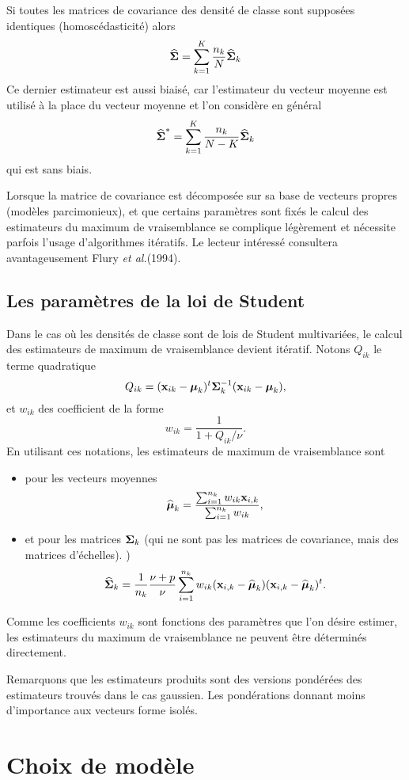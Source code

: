 Si toutes les matrices de covariance des densit\'e de classe sont
suppos\'ees identiques (homosc\'edasticit\'e) alors
$$
\widehat{\mbox{\boldmath $\Sigma$}}= \sum_{k=1}^{K} \frac{n_k}{N}\widehat{\mbox{\boldmath $\Sigma$}}_k
$$
Ce dernier estimateur est aussi biais\'e, car l'estimateur du vecteur moyenne 
est utilis\'e \`a la place du vecteur moyenne  et l'on consid\`ere en g\'en\'eral
$$
\widehat{\mbox{\boldmath $\Sigma$}}^*= \sum_{k=1}^{K} \frac{n_k}{N-K}\widehat{\mbox{\boldmath $\Sigma$}}_k
$$
qui est sans biais.


Lorsque la matrice de covariance est d\'ecompos\'ee sur sa base
de vecteurs propres (mod\`eles parcimonieux), et que certains param\`etres 
sont fix\'es le calcul des estimateurs du maximum de vraisemblance se
complique l\'eg\`erement et n\'ecessite parfois l'usage
d'algorithmes it\'eratifs. Le lecteur int\'eress\'e consultera
avantageusement Flury {\em et al.}(1994).


\subsection{Les param\`etres de la loi de Student}
Dans le cas o\`u les densit\'es de classe sont de lois de Student
multivari\'ees, le calcul des estimateurs de maximum de vraisemblance
devient it\'eratif. Notons $Q_{ik}$ le terme quadratique
$$
Q_{ik}=(\mbox{\bf x}_{ik}-\mbox{\boldmath $\mu$}_k)^t\mbox{\boldmath $\Sigma$}_k^{-1}(\mbox{\bf x}_{ik}-\mbox{\boldmath $\mu$}_k), 
$$
et $w_{ik}$ des coefficient de la forme
$$
w_{ik}=\frac{1}{1+Q_{ik}/\nu}.
$$
En utilisant ces notations, les estimateurs de maximum de
vraisemblance sont
\begin{itemize}
\item pour les vecteurs moyennes 
$$
\widehat{\mbox{\boldmath $\mu$}}_k=\frac{\sum_{i=1}^{n_k} w_{ik}\mbox{\bf x}_{i,k}}{\sum_{i=1}^{n_k} w_{ik }},
$$
\item et pour les matrices $\mbox{\boldmath $\Sigma$}_k$ (qui ne sont pas les matrices de covariance,
mais des matrices d'\'echelles). 
)
$$
\widehat{\mbox{\boldmath $\Sigma$}}_k=\frac{1}{n_k}\frac{\nu+p}{\nu} \sum_{i=1}^{n_k} w_{ik} (\mbox{\bf x}_{i,k}-\widehat{\mbox{\boldmath $\mu$}}_k)(\mbox{\bf x}_{i,k}-\widehat{\mbox{\boldmath $\mu$}}_k)^t.
$$
\end{itemize}
Comme les coefficients $w_{ik}$ sont fonctions des param\`etres que l'on
d\'esire estimer, les estimateurs du maximum de vraisemblance ne peuvent
\^etre d\'etermin\'es directement. 

Remarquons que les estimateurs produits sont des versions pond\'er\'ees
des estimateurs trouv\'es dans le cas gaussien. Les pond\'erations
donnant moins d'importance aux vecteurs forme isol\'es. 


\section{Choix de mod\`ele}

